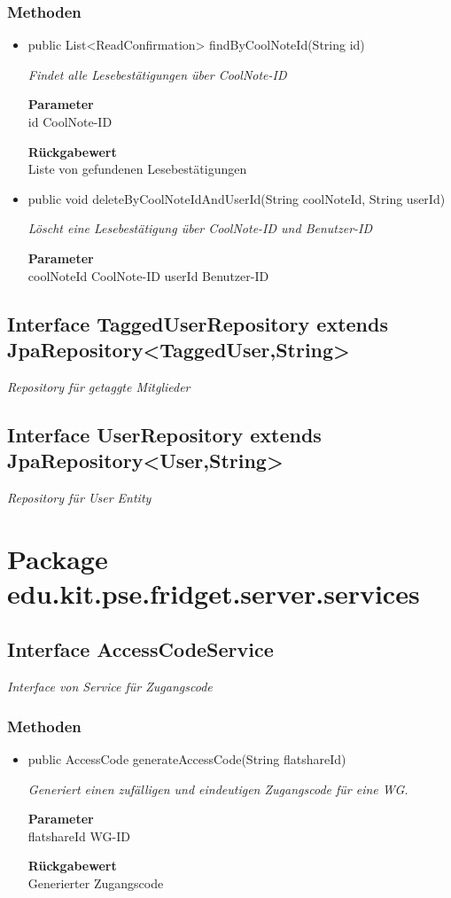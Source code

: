 \documentclass[a4paper]{scrreprt}
\begin{document}
        \subsubsection{Methoden}
        \begin{itemize}
        	\item{public List<ReadConfirmation> findByCoolNoteId(String id)}
        	
        	\textit{Findet alle Lesebestätigungen über CoolNote-ID}
        	
        	\textbf{Parameter} \\
        	id CoolNote-ID
        	
        	\textbf{Rückgabewert} \\
        	Liste von gefundenen Lesebestätigungen        \item{public void deleteByCoolNoteIdAndUserId(String coolNoteId, String userId)}
        	
        	\textit{Löscht eine Lesebestätigung über CoolNote-ID und Benutzer-ID}
        	
        	\textbf{Parameter} \\
        	coolNoteId CoolNote-ID
        	userId Benutzer-ID
        	
        	
        \end{itemize}
        \subsection{Interface TaggedUserRepository extends JpaRepository<TaggedUser,String>}
        \textit{Repository für getaggte Mitglieder}
        \subsection{Interface UserRepository extends JpaRepository<User,String>}
        \textit{Repository für User Entity}
        \section{Package edu.kit.pse.fridget.server.services}
        \subsection{Interface AccessCodeService}
        \textit{Interface von Service für Zugangscode}
        \subsubsection{Methoden}
        \begin{itemize}
        	\item{public AccessCode generateAccessCode(String flatshareId)}
        	
        	\textit{Generiert einen zufälligen und eindeutigen Zugangscode für eine WG.}
        	
        	\textbf{Parameter} \\
        	flatshareId WG-ID
        	
        	\textbf{Rückgabewert} \\
        	Generierter Zugangscode
        \end{itemize}
\end{document}
